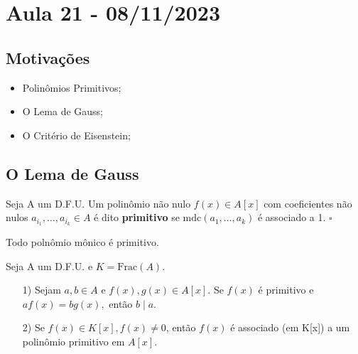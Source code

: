 \documentclass[AlgebraII/algebraII_notes.tex]{subfiles}
\begin{document}
\section{Aula 21 - 08/11/2023}
\subsection{Motivações}
\begin{itemize}
	\item Polinômios Primitivos;
	\item O Lema de Gauss;
	\item O Critério de Eisenstein;
\end{itemize}
\subsection{O Lema de Gauss}
\begin{def*}
	Seja A um D.F.U. Um polinômio não nulo \(f(x)\in A[x]\) com coeficientes não nulos \(a_{i_{1}},\dotsc, a_{i_{k}}\in A\) é dito
	\textbf{primitivo} se \(\mathrm{mdc}(a_{1}, \dotsc, a_{k})\) é associado a 1. \(\square\)
\end{def*}
\begin{example}
	Todo polnômio mônico é primitivo.
\end{example}
\begin{lemma*}
	Seja A um D.F.U. e \(K = \mathrm{Frac}(A)\).
	\begin{itemize}
		\item[1)] Sejam \(a, b\in A\) e \(f(x), g(x)\in A[x].\) Se \(f(x)\) é primitivo e \(af(x) = bg(x),\)
		      então \(b\mid a.\)
		\item[2)] Se \(f(x)\in K[x], f(x)\neq 0\), então \(f(x)\) é associado (em K[x]) a um polinômio primitivo em \(A[x]\).
	\end{itemize}
\end{lemma*}
\end{document}
